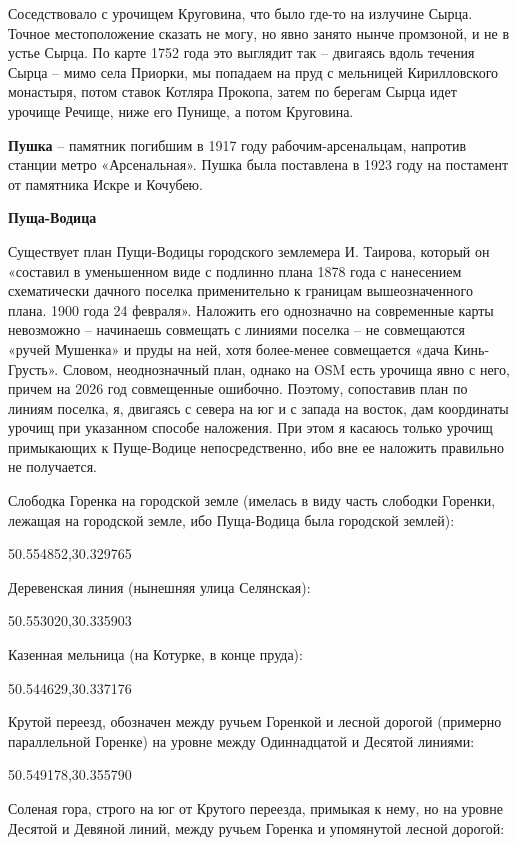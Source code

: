 Соседствовало с урочищем Круговина, что было где-то на излучине Сырца. Точное местоположение сказать не могу, но явно занято нынче промзоной, и не в устье Сырца. По карте 1752 года это выглядит так – двигаясь вдоль течения Сырца – мимо села Приорки, мы попадаем на пруд с мельницей Кирилловского монастыря, потом ставок Котляра Прокопа, затем по берегам Сырца идет урочище Речище, ниже его Пунище, а потом Круговина.\\

\medskip

\textbf{Пушка} – памятник погибшим в 1917 году рабочим-арсенальцам, напротив станции метро «Арсенальная». Пушка была поставлена в 1923 году на постамент от памятника Искре и Кочубею.\\

\medskip

\textbf{Пуща-Водица}

Существует план Пущи-Водицы городского землемера И. Таирова, который он «составил в уменьшенном виде с подлинно плана 1878 года с нанесением схематически дачного поселка применительно к границам вышеозначенного плана. 1900 года 24 февраля». Наложить его однозначно на современные карты невозможно – начинаешь совмещать с линиями поселка –  не совмещаются «ручей Мушенка» и пруды на ней, хотя более-менее совмещается «дача Кинь-Грусть». Словом, неоднозначный план, однако на OSM есть урочища явно с него, причем на 2026 год совмещенные ошибочно. Поэтому, сопоставив план по линиям поселка, я, двигаясь с севера на юг и с запада на восток, дам координаты урочищ при указанном способе наложения. При этом я касаюсь только урочищ примыкающих к Пуще-Водице непосредственно, ибо вне ее наложить правильно не получается.

Слободка Горенка на городской земле (имелась в виду часть слободки Горенки, лежащая на городской земле, ибо Пуща-Водица была городской землей): 

50.554852,30.329765

Деревенская линия (нынешняя улица Селянская):

50.553020,30.335903

Казенная мельница (на Котурке, в конце пруда):

50.544629,30.337176

Крутой переезд, обозначен между ручьем Горенкой и лесной дорогой (примерно параллельной Горенке) на уровне между Одиннадцатой и Десятой линиями:

50.549178,30.355790

Соленая гора, строго на юг от Крутого переезда, примыкая к нему, но на уровне Десятой и Девяной линий, между ручьем Горенка и упомянутой лесной дорогой:

